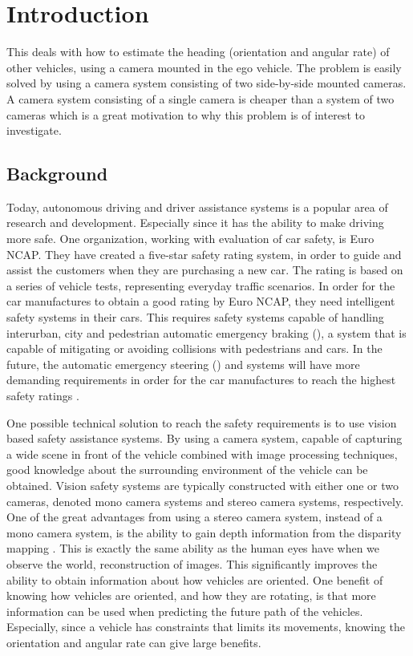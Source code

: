 \chapter{Introduction}
\label{cha:intro}
This \ms deals with how to estimate the heading (orientation and angular rate) of other vehicles, using a camera mounted in the ego vehicle.
The problem is easily solved by using a camera system consisting of two side-by-side mounted cameras.
A camera system consisting of a single camera is cheaper than a system of two cameras which is a great motivation to why this problem is of interest to investigate.

\section{Background}
Today, autonomous driving and driver assistance systems is a popular area of research and development.
Especially since it has the ability to make driving more safe.
One organization, working with evaluation of car safety, is Euro NCAP.
They have created a five-star safety rating system, in order to guide and assist the customers when they are purchasing a new car.
The rating is based on a series of vehicle tests, representing everyday traffic scenarios. 
In order for the car manufactures to obtain a good rating by Euro NCAP, they need intelligent safety systems in their cars.
This requires safety systems capable of handling \eg interurban, city and pedestrian automatic emergency braking (\abbrAEB), \ie a system that is capable of mitigating or avoiding collisions with pedestrians and cars.
In the future, the automatic emergency steering (\abbrAES) and \abbrAEB systems will have more demanding requirements in order for the car manufactures to reach the highest safety ratings \cite{EuroNCAP:2017}.

One possible technical solution to reach the safety requirements is to use vision based safety assistance systems.
By using a camera system, capable of capturing a wide scene in front of the vehicle combined with image processing techniques, good knowledge about the surrounding environment of the vehicle can be obtained.
Vision safety systems are typically constructed with either one or two cameras, denoted mono camera systems and stereo camera systems, respectively.
One of the great advantages from using a stereo camera system, instead of a mono camera system, is the ability to gain depth information from the disparity mapping \citep{Sivaraman:2013}.
This is exactly the same ability as the human eyes have when we observe the world, \ie reconstruction of  images.
This significantly improves the ability to obtain information about how vehicles are \eg oriented.
One benefit of knowing how vehicles are oriented, and how they are rotating, is that more information can be used when predicting the future path of the vehicles.
Especially, since \eg a vehicle has constraints that limits its movements, knowing the orientation and angular rate can give large benefits.

